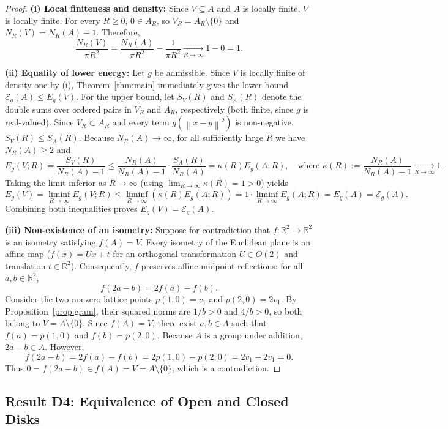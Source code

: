 \documentclass[11pt, a4paper]{article}
\theoremstyle{definition}
\theoremstyle{remark}
\newcommand{\R}{\mathbb{R}}
\newcommand{\Ecal}{\mathcal{E}}
\newcommand{\norm}[1]{\left\lVert #1 \right\rVert}
\begin{document}
\begin{proof}
\textbf{(i) Local finiteness and density:} Since $V \subseteq A$ and $A$ is locally finite, $V$ is locally finite. For every $R \ge 0$, $0 \in A_R$, so $V_R = A_R \setminus \{0\}$ and $N_R(V) = N_R(A) - 1$. Therefore,
\[
\frac{N_R(V)}{\pi R^2} = \frac{N_R(A)}{\pi R^2} - \frac{1}{\pi R^2} \xrightarrow[R \to \infty]{} 1 - 0 = 1.
\]

\noindent \textbf{(ii) Equality of lower energy:} Let $g$ be admissible. Since $V$ is locally finite of density one by (i), Theorem~\ref{thm:main} immediately gives the lower bound $\Ecal_g(A) \le E_g(V)$. For the upper bound, let $S_V(R)$ and $S_A(R)$ denote the double sums over ordered pairs in $V_R$ and $A_R$, respectively (both finite, since $g$ is real-valued). Since $V_R \subset A_R$ and every term $g(\norm{x - y}^2)$ is non-negative, $S_V(R) \le S_A(R)$. Because $N_R(A) \to \infty$, for all sufficiently large $R$ we have $N_R(A) \ge 2$ and
\[
E_g(V; R) = \frac{S_V(R)}{N_R(A) - 1} \le \frac{N_R(A)}{N_R(A) - 1} \cdot \frac{S_A(R)}{N_R(A)} = \kappa(R) E_g(A; R), \quad \text{where } \kappa(R) := \frac{N_R(A)}{N_R(A) - 1} \xrightarrow[R \to \infty]{} 1.
\]
Taking the limit inferior as $R \to \infty$ (using $\lim_{R \to \infty} \kappa(R) = 1 > 0$) yields
\[
E_g(V) = \liminf_{R \to \infty} E_g(V; R) \le \liminf_{R \to \infty} \left(\kappa(R) E_g(A; R)\right) = 1 \cdot \liminf_{R \to \infty} E_g(A; R) = E_g(A) = \Ecal_g(A).
\]
Combining both inequalities proves $E_g(V) = \Ecal_g(A)$.

\noindent \textbf{(iii) Non-existence of an isometry:} Suppose for contradiction that $f : \R^2 \to \R^2$ is an isometry satisfying $f(A) = V$. Every isometry of the Euclidean plane is an affine map ($f(x) = U x + t$ for an orthogonal transformation $U \in O(2)$ and translation $t \in \R^2$). Consequently, $f$ preserves affine midpoint reflections: for all $a, b \in \R^2$,
\[
f(2a - b) = 2f(a) - f(b).
\]
Consider the two nonzero lattice points $p(1, 0) = v_1$ and $p(2, 0) = 2v_1$. By Proposition~\ref{prop:gram}, their squared norms are $1/b > 0$ and $4/b > 0$, so both belong to $V = A \setminus \{0\}$. Since $f(A) = V$, there exist $a, b \in A$ such that $f(a) = p(1, 0)$ and $f(b) = p(2, 0)$. Because $A$ is a group under addition, $2a - b \in A$. However,
\[
f(2a - b) = 2f(a) - f(b) = 2 p(1, 0) - p(2, 0) = 2v_1 - 2v_1 = 0.
\]
Thus $0 = f(2a - b) \in f(A) = V = A \setminus \{0\}$, which is a contradiction.
\end{proof}

\subsection{Result D4: Equivalence of Open and Closed Disks}
\label{sec:D4}
\end{document}
